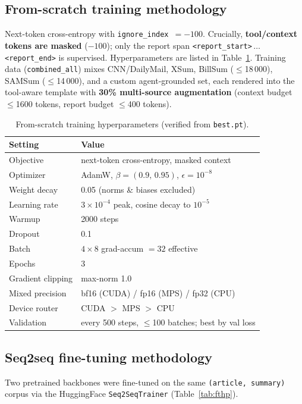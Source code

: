 \documentclass[11pt,a4paper]{article}
\newcommand{\tok}[1]{\texttt{\textless\textbar #1\textbar\textgreater}}
\begin{document}
\subsection{From-scratch training methodology}
Next-token cross-entropy with \texttt{ignore\_index}~$=-100$. Crucially,
\textbf{tool/context tokens are masked} ($-100$); only the report span
\tok{report\_start}\,$\ldots$\,\tok{report\_end} is supervised. Hyperparameters
are listed in Table~\ref{tab:trainhp}. Training data (\texttt{combined\_all})
mixes CNN/DailyMail, XSum, BillSum ($\leq$18\,000), SAMSum ($\leq$14\,000), and
a custom agent-grounded set, each rendered into the tool-aware template with
\textbf{30\% multi-source augmentation} (context budget $\leq$1600 tokens,
report budget $\leq$400 tokens).

\begin{table}[h]
\centering
\caption{From-scratch training hyperparameters (verified from \texttt{best.pt}).}
\label{tab:trainhp}
\small
\begin{tabular}{@{}ll@{}}
\toprule
\textbf{Setting} & \textbf{Value} \\
\midrule
Objective         & next-token cross-entropy, masked context \\
Optimizer         & AdamW, $\beta=(0.9,\,0.95)$, $\epsilon=10^{-8}$ \\
Weight decay      & 0.05 (norms \& biases excluded) \\
Learning rate     & $3\times10^{-4}$ peak, cosine decay to $10^{-5}$ \\
Warmup            & 2000 steps \\
Dropout           & 0.1 \\
Batch             & $4 \times 8$ grad-accum $= 32$ effective \\
Epochs            & 3 \\
Gradient clipping & max-norm 1.0 \\
Mixed precision   & bf16 (CUDA) / fp16 (MPS) / fp32 (CPU) \\
Device router     & CUDA $>$ MPS $>$ CPU \\
Validation        & every 500 steps, $\leq$100 batches; best by val loss \\
\bottomrule
\end{tabular}
\end{table}

\subsection{Seq2seq fine-tuning methodology}
Two pretrained backbones were fine-tuned on the same \texttt{(article, summary)}
corpus via the HuggingFace \texttt{Seq2SeqTrainer} (Table~\ref{tab:fthp}).
\end{document}

